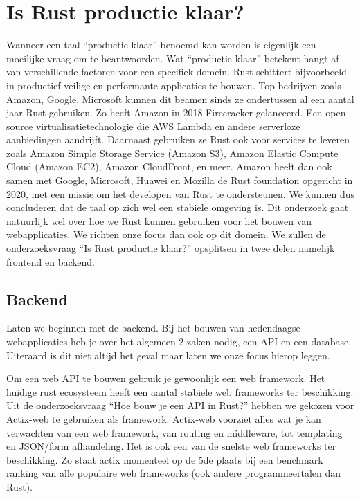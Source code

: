 \clearpage

\section{Is Rust productie klaar?}

Wanneer een taal “productie klaar” benoemd kan worden is eigenlijk een moeilijke vraag om te
beantwoorden. Wat “productie klaar” betekent hangt af van verschillende factoren voor een specifiek
domein. Rust schittert bijvoorbeeld in productief veilige en performante applicaties te bouwen. Top
bedrijven zoals Amazon, Google, Microsoft kunnen dit beamen sinds ze ondertussen al een aantal jaar
Rust gebruiken. Zo heeft Amazon in 2018 Firecracker gelanceerd. Een open source
virtualisatietechnologie die AWS Lambda en andere serverloze aanbiedingen aandrijft. Daarnaast
gebruiken ze Rust ook voor services te leveren zoals Amazon Simple Storage Service (Amazon S3),
Amazon Elastic Compute Cloud (Amazon EC2), Amazon CloudFront, en meer. Amazon heeft dan ook samen
met Google, Microsoft, Huawei en Mozilla de Rust foundation opgericht in 2020, met een missie om het
developen van Rust te ondersteunen. We kunnen dus concluderen dat de taal op zich wel een stabiele
omgeving is. Dit onderzoek gaat natuurlijk wel over hoe we Rust kunnen gebruiken voor het bouwen van
webapplicaties. We richten onze focus dan ook op dit domein. We zullen de onderzoeksvraag “Is Rust
productie klaar?” opsplitsen in twee delen namelijk frontend en backend. 

\subsection{Backend }

Laten we beginnen met de backend. Bij het bouwen van hedendaagse webapplicaties heb je over het
algemeen 2 zaken nodig, een API en een database. Uiteraard is dit niet altijd het geval maar laten
we onze focus hierop leggen. 

Om een web API te bouwen gebruik je gewoonlijk een web framework. Het huidige rust ecosysteem heeft
een aantal stabiele web frameworks ter beschikking. Uit de onderzoeksvraag “Hoe bouw je een API in
Rust?” hebben we gekozen voor Actix-web te gebruiken als framework. Actix-web voorziet alles wat je
kan verwachten van een web framework, van routing en middleware, tot templating en JSON/form
afhandeling. Het is ook een van de snelste web frameworks ter beschikking. Zo staat actix momenteel
op de 5de plaats bij een benchmark ranking van alle populaire web frameworks (ook andere
programmeertalen dan Rust). 


